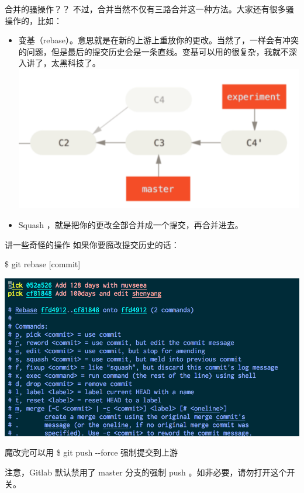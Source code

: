 \documentclass{beamer}
\begin{document}
\begin{frame}{合并的骚操作？？}
    不过，合并当然不仅有三路合并这一种方法。大家还有很多骚操作的，比如：

    \begin{itemize}
        \item 变\quad 基（rebase）。意思就是在新的上游上重放你的更改。当然了，一样会有冲突的问题，但是最后的提交历史会是一条直线。变基可以用的很复杂，我就不深入讲了，太黑科技了。
        \includegraphics[width=\linewidth]{2018-10-26-16-23-42.png}
        \item Squash ，就是把你的更改全部合并成一个提交，再合并进去。
    \end{itemize}
\end{frame}

\begin{frame}{讲一些奇怪的操作}
    如果你要魔改提交历史的话：

    \$ git rebase [commit]

    \includegraphics[width=\linewidth]{2018-10-26-20-03-30.png}

    魔改完可以用 \$ git push -{}-force 强制提交到上游

    注意，Gitlab 默认禁用了 master 分支的强制 push 。如非必要，请勿打开这个开关。
\end{frame}
\end{document}
